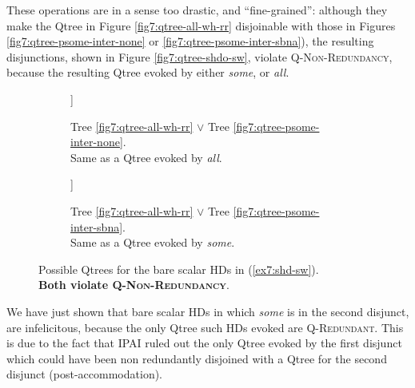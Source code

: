 These operations are in a sense too drastic, and ``fine-grained'': although they make the Qtree in Figure \ref{fig7:qtree-all-wh-rr} disjoinable with those in Figures \ref{fig7:qtree-psome-inter-none} or \ref{fig7:qtree-psome-inter-sbna}), the resulting disjunctions, shown in Figure \ref{fig7:qtree-shdo-sw}, violate \textsc{Q-Non-Redundancy}, because the resulting Qtree evoked by either \textit{some}, or \textit{all}.

\begin{figure}[H]
	\centering
	\hfill
	\begin{subfigure}[b]{.45\linewidth}
		\centering
		\begin{forest}
			[CS[$\neg\exists$][{$\exists\wedge\neg\forall$}][\fbox{$\forall$}]]
		\end{forest}
		\caption[]{Tree \ref{fig7:qtree-all-wh-rr} $\vee$ Tree \ref{fig7:qtree-psome-inter-none}.\\Same as a Qtree evoked by \textit{all}. }\label{fig7:qtree-shd-sw1}
	\end{subfigure}
	\hfill
	\begin{subfigure}[b]{.45\linewidth}
		\centering
		\begin{forest}
			[CS[$\neg\exists$][\fbox{$\exists\wedge\neg\forall$}][\fbox{$\forall$}]]
		\end{forest}
		\caption[]{Tree \ref{fig7:qtree-all-wh-rr} $\vee$ Tree \ref{fig7:qtree-psome-inter-sbna}.\\Same as a Qtree evoked by \textit{some}.}\label{fig7:qtree-shd-sw2}
	\end{subfigure}
	\caption[]{Possible Qtrees for the bare scalar HDs in (\ref{ex7:shd-sw}).\\\textbf{Both violate \textsc{Q-Non-Redundancy}}.}\label{fig7:qtree-shd-sw}
\end{figure}

We have just shown that bare scalar HDs in which \textit{some} is in the second disjunct, are infelicitous, because the only Qtree such HDs evoked are \textsc{Q-Redundant}. This is due to the fact that IPAI ruled out the only Qtree evoked by the first disjunct which could have been non redundantly disjoined with a Qtree for the second disjunct (post-accommodation). \\

%


